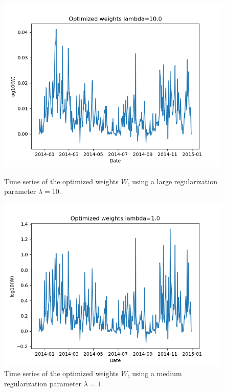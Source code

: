\documentclass{article}
\begin{document}
\begin{figure}
	\centering
	\begin{minipage}{.31\textwidth}
		\centering
		\includegraphics[width=\linewidth]{../plots/Optimized_weights_timeseries_lambda10.png}
		\caption{Time series of the optimized weights $W$, using a large regularization parameter $\lambda=10$.}
		\label{fig: optimized weights timeseries lambda=10}
	\end{minipage}\hfill
	\begin{minipage}{.31\textwidth}
		\centering
		\includegraphics[width=\linewidth]{../plots/Optimized_weights_timeseries_lambda1.png}
		\caption{Time series of the optimized weights $W$, using a medium regularization parameter $\lambda=1$.}

\end{minipage}
\end{figure}
\end{document}
